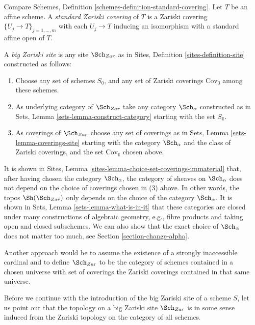 \begin{definition}
\label{definition-standard-Zariski}
Compare Schemes, Definition \ref{schemes-definition-standard-covering}.
Let $T$ be an affine scheme. A {\it standard Zariski covering}
of $T$ is a Zariski covering $\{U_j \to T\}_{j = 1, \ldots, m}$
with each $U_j \to T$ inducing an isomorphism with a standard affine open
of $T$.
\end{definition}

\begin{definition}
\label{definition-big-zariski-site}
A {\it big Zariski site} is any site $\Sch_{Zar}$ as in
Sites, Definition \ref{sites-definition-site} constructed as follows:
\begin{enumerate}
\item Choose any set of schemes $S_0$, and any set of Zariski coverings
$\text{Cov}_0$ among these schemes.
\item As underlying category of $\Sch_{Zar}$
take any category $\Sch_\alpha$ constructed as in
Sets, Lemma \ref{sets-lemma-construct-category} starting with the set $S_0$.
\item As coverings of $\Sch_{Zar}$ choose any set of coverings as in
Sets, Lemma \ref{sets-lemma-coverings-site} starting with the
category $\Sch_\alpha$ and the class of Zariski coverings,
and the set $\text{Cov}_0$ chosen above.
\end{enumerate}
\end{definition}

\noindent
It is shown in Sites, Lemma \ref{sites-lemma-choice-set-coverings-immaterial}
that, after having chosen the category $\Sch_\alpha$, the
category of sheaves on $\Sch_\alpha$ does not depend on the
choice of coverings chosen in (3) above. In other words, the topos
$\Sh(\Sch_{Zar})$ only depends on the choice of
the category $\Sch_\alpha$. It is shown in
Sets, Lemma \ref{sets-lemma-what-is-in-it} that these categories
are closed under many constructions of algebraic geometry, e.g.,
fibre products and taking open and closed subschemes. We can also show
that the exact choice of $\Sch_\alpha$ does not matter
too much, see Section \ref{section-change-alpha}.

\medskip\noindent
Another approach would be to assume the existence of a
strongly inaccessible cardinal and to define $\Sch_{Zar}$
to be the category of schemes contained in a chosen universe with
set of coverings the Zariski coverings contained in that same
universe.

\medskip\noindent
Before we continue with the introduction of the big Zariski site of
a scheme $S$, let us point out that the topology on a big Zariski site
$\Sch_{Zar}$ is in some sense induced from the Zariski topology
on the category of all schemes.

